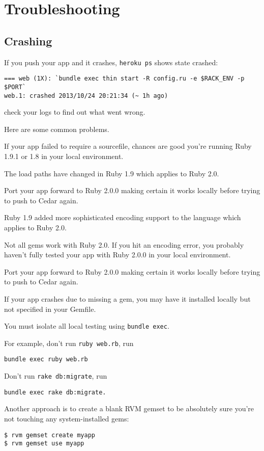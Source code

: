 \section{Troubleshooting}

\subsection{Crashing}
If you push your app and it crashes, 
\verb|heroku ps| shows state crashed:
\begin{verbatim}
=== web (1X): `bundle exec thin start -R config.ru -e $RACK_ENV -p $PORT`
web.1: crashed 2013/10/24 20:21:34 (~ 1h ago)
\end{verbatim}
check your logs to find out what went wrong. 

Here are some common
problems.


If your app failed to require a sourcefile, chances are good you’re
running Ruby 1.9.1 or 1.8 in your local environment. 

The load paths
have changed in Ruby 1.9 which applies to Ruby 2.0. 

Port your app
forward to Ruby 2.0.0 making certain it works locally before trying
to push to Cedar again.

Ruby 1.9 added more sophisticated encoding support to the language
which applies to Ruby 2.0. 

Not all gems work with Ruby 2.0. If you
hit an encoding error, you probably haven’t fully tested your app
with Ruby 2.0.0 in your local environment. 

Port your app forward
to Ruby 2.0.0 making certain it works locally before trying to push
to Cedar again.


If your app crashes due to missing a gem, you may have it installed
locally but not specified in your Gemfile. 

You must isolate all
local testing using \verb|bundle exec|. 

For example, don’t run \verb|ruby web.rb|,
run 

\begin{verbatim}
bundle exec ruby web.rb
\end{verbatim}
Don’t run \verb|rake db:migrate|, run 
\begin{verbatim}
bundle exec rake db:migrate.
\end{verbatim}
Another approach is to create a blank RVM gemset to be absolutely
sure you’re not touching any system-installed gems:
\begin{verbatim}
$ rvm gemset create myapp
$ rvm gemset use myapp
\end{verbatim}


